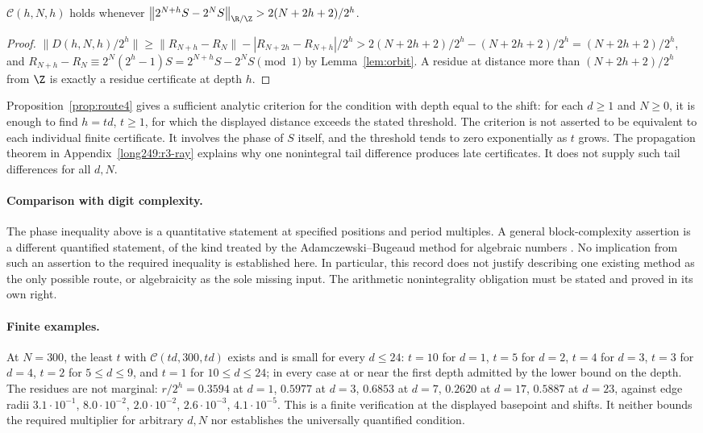 \begin{prop}\label{prop:route4}
$\mathcal{C}(h,N,h)$ holds whenever
$\bigl\|2^{N+h}S-2^{N}S\bigr\|_{\R/\Z}>2(N+2h+2)/2^{h}$.
\end{prop}

\begin{proof}
$\|D(h,N,h)/2^{h}\|\ge\|R_{N+h}-R_N\|-|R_{N+2h}-R_{N+h}|/2^{h}
 >2(N+2h+2)/2^{h}-(N+2h+2)/2^{h}=(N+2h+2)/2^{h}$, and
$R_{N+h}-R_N\equiv 2^{N}(2^{h}-1)S=2^{N+h}S-2^{N}S\pmod 1$ by
Lemma~\ref{lem:orbit}. A residue at distance more than $(N+2h+2)/2^{h}$ from
$\Z$ is exactly a residue certificate at depth $h$.
\end{proof}

\noindent
Proposition~\ref{prop:route4} gives a sufficient analytic
criterion for the condition with depth equal to the shift: for each
$d\ge1$ and $N\ge0$, it is enough to find
$h=td$, $t\ge1$, for which the displayed distance exceeds the stated
threshold. The criterion is not asserted to be equivalent to each individual
finite certificate. It involves the phase of $S$ itself, and the threshold
tends to zero exponentially as $t$ grows. The propagation theorem in Appendix~\ref{long249:r3-ray} explains why
one nonintegral tail difference produces late certificates. It does not
supply such tail differences for all $d,N$.

\paragraph{Comparison with digit complexity.}
The phase inequality above is a quantitative statement at specified
positions and period multiples. A general block-complexity assertion is a
different quantified statement, of the kind treated by the
Adamczewski--Bugeaud method for algebraic numbers
\cite[Theorem~1, p.~549]{adamczewski-bugeaud}. No implication from such an
assertion to the required inequality is established here. In particular, this record
does not justify describing one existing method as the only possible route,
or algebraicity as the sole missing input. The arithmetic nonintegrality
obligation must be stated and proved in its own right.

\paragraph{Finite examples.}
At $N=300$, the least $t$ with $\mathcal{C}(td,300,td)$ exists
and is small for every $d\le 24$: $t=10$ for $d=1$, $t=5$ for $d=2$,
$t=4$ for $d=3$, $t=3$ for $d=4$, $t=2$ for $5\le d\le 9$, and $t=1$ for
$10\le d\le 24$; in every case at or near the first depth admitted by the
lower bound on the depth. The residues are not marginal: $r/2^{h}=0.3594$ at $d=1$,
$0.5977$ at $d=3$, $0.6853$ at $d=7$, $0.2620$ at $d=17$, $0.5887$ at
$d=23$, against edge radii $3.1\cdot10^{-1}$, $8.0\cdot10^{-2}$,
$2.0\cdot10^{-2}$, $2.6\cdot10^{-3}$, $4.1\cdot10^{-5}$. This is a
finite verification at the displayed basepoint and shifts. It neither
bounds the required multiplier for arbitrary $d,N$ nor establishes the
universally quantified condition.

